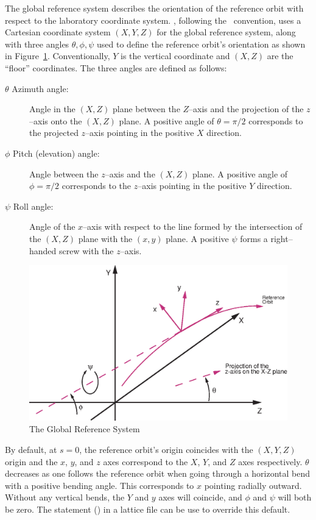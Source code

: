 The global reference system describes the orientation of the reference
orbit with respect to the laboratory coordinate system.  \bmad,
following the \mad\ convention, uses a Cartesian coordinate system
$(X, Y, Z)$ for the global reference system, along with three angles
$\theta, \phi, \psi$ used to define the reference orbit's orientation
as shown in Figure~\ref{f:global_coords}. Conventionally, $Y$ is the
vertical coordinate and $(X, Z)$ are the ``floor'' coordinates.  The
three angles are defined as follows:
\begin{description}
\item[$\theta$ Azimuth angle:] Angle in the $(X, Z)$ plane 
between the $Z$--axis and the projection of the $z$--axis onto the
$(X, Z)$ plane. A positive angle of $\theta = \pi/2$ corresponds to the
projected $z$--axis pointing in the positive $X$ direction.
\item[$\phi$ Pitch (elevation) angle:] Angle between the $z$--axis 
and the $(X,Z)$ plane. A positive angle of $\phi = \pi/2$ corresponds to
the $z$--axis pointing in the positive $Y$ direction.
\item[$\psi$ Roll angle:] Angle of the $x$--axis with respect 
to the line formed by the
intersection of the $(X, Z)$ plane with the $(x, y)$ plane. A
positive $\psi$ forms a right--handed screw with the $z$--axis.
\end{description}

\begin{figure}
\centering
\includegraphics{global_coords.eps}
\caption{The Global Reference System}
\label{f:global_coords}
\end{figure}

By default, at $s = 0$, the reference orbit's origin coincides with
the $(X, Y, Z)$ origin and the $x$, $y$, and $z$ axes correspond to
the $X$, $Y$, and $Z$ axes respectively. $\theta$ decreases as one
follows the reference orbit when going through a horizontal bend with
a positive bending angle. This corresponds to $x$ pointing radially
outward. Without any vertical bends, the $Y$ and $y$ axes will
coincide, and $\phi$ and $\psi$ will both be zero. The 
statement () in a lattice file can be use to override
this default.

